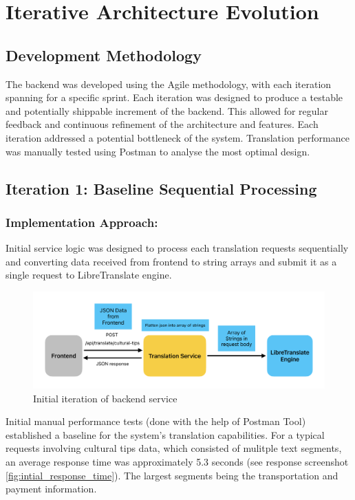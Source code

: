 \section{Iterative Architecture Evolution}

\subsection{Development Methodology}

The backend was developed using the Agile methodology, with each iteration spanning for a specific sprint. Each iteration was designed to produce a testable and potentially shippable increment of the backend. This allowed for regular feedback and continuous refinement of the architecture and features. Each iteration addressed a potential bottleneck of the system. Translation performance was manually tested using Postman\cite{postman2025} to analyse the most optimal design.

\subsection{Iteration 1: Baseline Sequential Processing}

\subsubsection{Implementation Approach:} Initial service logic was designed to process each translation requests sequentially and converting data received from frontend to string arrays and submit it as a single request to LibreTranslate engine.

\begin{figure}[H]
    \centering
    \includegraphics[width=1\linewidth]{chapter/05_implementation/backend/B_architectural_design/Backend_Initial_Concept.pdf}
    \caption{Initial iteration of backend service}
    \label{fig:backend_iteration_1}
\end{figure}

Initial manual performance tests (done with the help of Postman Tool\cite{postman2025}) established a baseline for the system's translation capabilities. For a typical requests involving cultural tips data, which consisted of mulitple text segments, an average response time was approximately 5.3 seconds (see response screenshot \ref{fig:intial_response_time}). The largest segments being the transportation and payment information.

